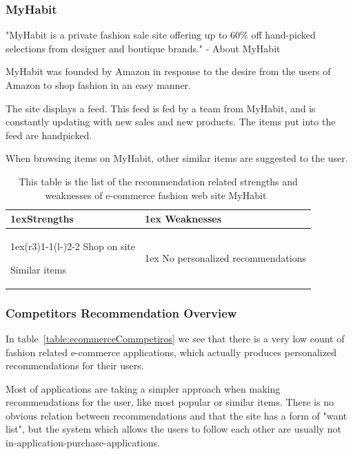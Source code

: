 \subsubsection{MyHabit}
\label{par:myhabit}

"MyHabit is a private fashion sale site offering up to 60\% off hand-picked
selections from designer and boutique brands." - About MyHabit~\cite{MyHabit}

MyHabit was founded by Amazon in response to the desire from the users of
Amazon to shop fashion in an easy manner.

The site displays a feed.  This feed is fed by a team from MyHabit, and is
constantly updating with new sales and new products.  The items put into the
feed are handpicked.

When browsing items on MyHabit, other similar items are suggested to the user.

\begin{table}[H]
  \centering
  \begin{tabularx}{\linewidth}{>{\parskip1ex}X@{\kern4\tabcolsep}>{\parskip1ex}X}
    \toprule
    \hfil\bfseries Strengths & \hfil\bfseries Weaknesses \\
    \cmidrule(r{3\tabcolsep}){1-1}\cmidrule(l{-\tabcolsep}){2-2}
    Shop on site \par
    Similar items \par
    &
    No personalized recommendations \par \\
    \bottomrule
  \end{tabularx}
  \caption[Recommendation related strengths and weaknesses of MyHabit~\cite{MyHabit}]{This table is the list of the recommendation related strengths and weaknesses of e-commerce fashion web site MyHabit~\cite{MyHabit}}
  \label{table:ecommenreceMyHabit}
\end{table}

\subsubsection{Competitors Recommendation Overview}
\label{par:competitors_recommendation_overview}

In table~\ref{table:ecommerceCommpetiros} we see that there is a very low count
of fashion related e-commerce applications, which actually produces
personalized recommendations for their users.

Most of applications are taking a simpler approach when making recommendations
for the user, like most popular or similar items.  There is no obvious relation
between recommendations and that the site has a form of "want list", but the
system which allows the users to follow each other are usually not
in-application-purchase-applications.


